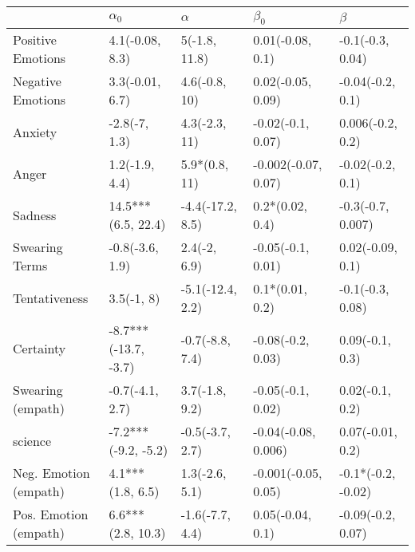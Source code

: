 \begin{tabular}{lllll}
\toprule
{} &            $\alpha_0$ &          $\alpha$ &            $\beta_0$ &             $\beta$ \\
\midrule
Positive Emotions     &       4.1(-0.08, 8.3) &     5(-1.8, 11.8) &     0.01(-0.08, 0.1) &    -0.1(-0.3, 0.04) \\
Negative Emotions     &       3.3(-0.01, 6.7) &     4.6(-0.8, 10) &    0.02(-0.05, 0.09) &    -0.04(-0.2, 0.1) \\
Anxiety               &         -2.8(-7, 1.3) &     4.3(-2.3, 11) &    -0.02(-0.1, 0.07) &    0.006(-0.2, 0.2) \\
Anger                 &        1.2(-1.9, 4.4) &     5.9*(0.8, 11) &  -0.002(-0.07, 0.07) &    -0.02(-0.2, 0.1) \\
Sadness               &    14.5***(6.5, 22.4) &  -4.4(-17.2, 8.5) &      0.2*(0.02, 0.4) &   -0.3(-0.7, 0.007) \\
Swearing Terms        &       -0.8(-3.6, 1.9) &      2.4(-2, 6.9) &    -0.05(-0.1, 0.01) &    0.02(-0.09, 0.1) \\
Tentativeness         &            3.5(-1, 8) &  -5.1(-12.4, 2.2) &      0.1*(0.01, 0.2) &    -0.1(-0.3, 0.08) \\
Certainty             &  -8.7***(-13.7, -3.7) &   -0.7(-8.8, 7.4) &    -0.08(-0.2, 0.03) &     0.09(-0.1, 0.3) \\
Swearing (empath)     &       -0.7(-4.1, 2.7) &    3.7(-1.8, 9.2) &    -0.05(-0.1, 0.02) &     0.02(-0.1, 0.2) \\
science               &   -7.2***(-9.2, -5.2) &   -0.5(-3.7, 2.7) &  -0.04(-0.08, 0.006) &    0.07(-0.01, 0.2) \\
Neg. Emotion (empath) &      4.1***(1.8, 6.5) &    1.3(-2.6, 5.1) &  -0.001(-0.05, 0.05) &  -0.1*(-0.2, -0.02) \\
Pos. Emotion (empath) &     6.6***(2.8, 10.3) &   -1.6(-7.7, 4.4) &     0.05(-0.04, 0.1) &   -0.09(-0.2, 0.07) \\
\bottomrule
\end{tabular}
